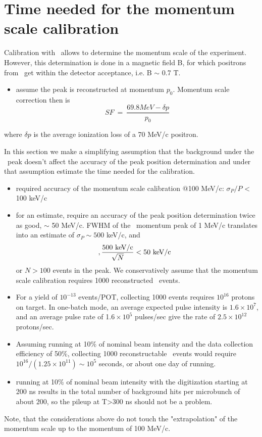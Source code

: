 \section{Time needed for the momentum scale calibration }

Calibration with \piplusenu\ allows to determine the momentum scale of the experiment.
However, this determination is done in a magnetic field B, for which positrons
from \piplusenu\ get within the detector acceptance, i.e. B $\sim$ 0.7 T.

\begin{itemize}
\item
  assume the peak is reconstructed at momentum $p_0$. Momentum scale correction then is
  $$
                SF ~=~ \frac{69.8 MeV - \delta p} {p_0}
  $$
\end{itemize}
where $\delta p$ is the average ionization loss of a 70 MeV/c positron.

In this section we make a simplifying assumption that the background under the \piplusenu\
peak doesn't affect the accuracy of the peak position determination and under that assumption
estimate the time needed for the calibration.

\begin{itemize}
\item 
  required accuracy of the momentum scale calibration $@$100 MeV/c: $\sigma_P/P$ < 100 keV/c
\item
  for an estimate, require an accuracy of the peak position determination
  twice as good, $\sim$ 50 MeV/c.
  FWHM of the \piplusenu\ momentum peak of 1 MeV/c translates into an estimate of
  $\sigma_P \sim 500$ keV/c, and 
  $$,
  \frac {500 {\rm ~keV/c}}{\sqrt N} <  50 {\rm ~keV/c} ~~
  $$
  or $N > 100$ events in the peak. We conservatively assume that the momentum scale calibration
  requires 1000 reconstructed \piplusenu\ events.
\item
  For a yield of $10^{-13}$ events/POT, collecting 1000 events requires $10^{16}$ protons on target.
  In one-batch mode, an average expected pulse intensity is $1.6 \times 10^7$, and
  an average  pulse rate of 1$.6 \times 10^5$ pulses/sec give the rate of $2.5 \times 10^{12}$ protons/sec.
\item
  Assuming running at 10\% of nominal beam intensity and the data collection efficiency of 50\%,
  collecting 1000 reconstructable \piplusenu\ events would require
  $10^{16}/(1.25 \times 10^{11}) \sim 10^5$ seconds, or about one day of running.
\item
  running at 10\% of nominal beam intensity with the digitization starting at 200 ns results in 
  the total number of background hits per microbunch of about 200, so the pileup at T>300 ns
  should not be a problem.
\end{itemize}

Note, that the considerations above do not touch the "extrapolation" of the momentum scale up
to the momentum of 100 MeV/c.

